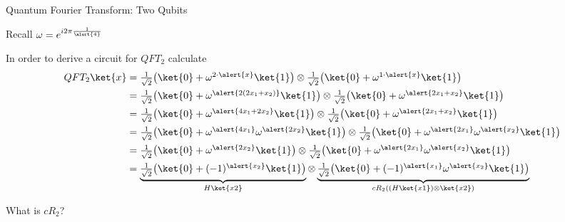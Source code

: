\documentclass{beamer}
\begin{document}
\begin{frame}{Quantum Fourier Transform: Two Qubits}

        {\scriptsize Recall $\omega = e^{i 2 \pi \frac{1}{\alert{4}}}$}

        In order to derive a circuit for $QFT_2$ calculate
        \begin{align*}
                QFT_2 \ket{x} & = \textstyle{\frac{1}{\sqrt{2}} \big (\ket{0} 
                + \omega^{2 \cdot \alert{x}} \ket{1} \big )}   \otimes
                \textstyle{\frac{1}{\sqrt{2}} \big (\ket{0} 
                + \omega^{1 \cdot \alert{x}} \ket{1} \big )} \\
                              & =
                              \textstyle{\frac{1}{\sqrt{2}} \big (\ket{0} 
                              + \omega^{\alert{2(2x_1 + x_2)}} \ket{1} \big )}\otimes
                              \textstyle{\frac{1}{\sqrt{2}} \big (\ket{0} 
                              + \omega^{\alert{2x_1 + x_2}} \ket{1} \big )} 
                              \\
                              & =
                              \textstyle{\frac{1}{\sqrt{2}} \big (\ket{0} 
                              + \omega^{\alert{4x_1 + 2 x_2}} \ket{1} \big )}\otimes
                              \textstyle{\frac{1}{\sqrt{2}} \big (\ket{0} 
                              + \omega^{\alert{2x_1 + x_2}} \ket{1} \big )} 
                              \\
                              & =
                              \textstyle{\frac{1}{\sqrt{2}} \big (\ket{0} 
                              + \omega^{\alert{4x_1}} \omega^{\alert{2 x_2}} \ket{1} \big )}
                              \otimes
                              \textstyle{\frac{1}{\sqrt{2}} \big (\ket{0} 
                              + \omega^{\alert{2x_1}} \omega^{\alert{x_2}} \ket{1} \big )} 
                              \\
                              & =
                              \textstyle{\frac{1}{\sqrt{2}} \big (\ket{0} 
                              + \omega^{\alert{2 x_2}} \ket{1} \big )}
                              \otimes
                              \textstyle{\frac{1}{\sqrt{2}} \big (\ket{0} 
                              + \omega^{\alert{2x_1}} \omega^{\alert{x_2}} \ket{1} \big )} 
                              \\
                              & =
                              \underbrace{\textstyle{\frac{1}{\sqrt{2}} \big (\ket{0} 
                              + (-1)^{\alert{x_2}} \ket{1} \big )}}_{H\ket{x2}}
                              \otimes
                              \underbrace{\textstyle{\frac{1}{\sqrt{2}} \big (\ket{0} 
                              + (-1)^{\alert{x_1}} \omega^{\alert{x_2}} \ket{1} \big )}}_{
                              cR_2((H\ket{x1}) \otimes \ket{x2})}
        \end{align*}

        \pause
        What is $cR_2$?

\end{frame}
\end{document}
